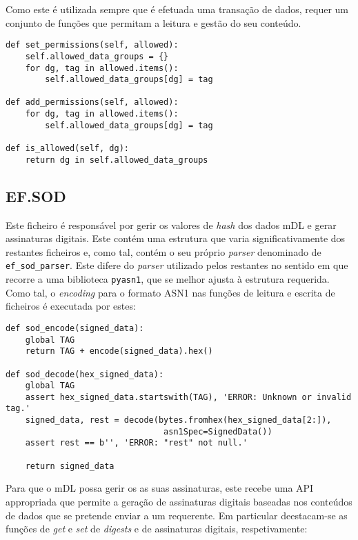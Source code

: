 Como este é utilizada sempre que é efetuada uma transação de dados, requer um conjunto de funções que permitam a leitura e gestão do seu conteúdo.

\begin{Verbatim}[frame=single, framerule=0.5mm]
def set_permissions(self, allowed):
    self.allowed_data_groups = {}
    for dg, tag in allowed.items():
        self.allowed_data_groups[dg] = tag

def add_permissions(self, allowed):
    for dg, tag in allowed.items():
        self.allowed_data_groups[dg] = tag

def is_allowed(self, dg):
    return dg in self.allowed_data_groups
\end{Verbatim}


\subsection{EF.SOD}

Este ficheiro é responsável por gerir os valores de \textit{hash} dos dados mDL e gerar assinaturas digitais. Este contém uma estrutura que varia significativamente dos restantes ficheiros e, como tal, contém o seu próprio \textit{parser} denominado de \texttt{ef\_sod\_parser}. Este difere do \textit{parser} utilizado pelos restantes no sentido em que recorre a uma biblioteca \texttt{pyasn1}, que se melhor ajusta à estrutura requerida. Como tal, o \textit{encoding} para o formato ASN1 nas funções de leitura e escrita de ficheiros é executada por estes:

\begin{Verbatim}[frame=single, framerule=0.5mm]
def sod_encode(signed_data):
    global TAG
    return TAG + encode(signed_data).hex()

def sod_decode(hex_signed_data):
    global TAG
    assert hex_signed_data.startswith(TAG), 'ERROR: Unknown or invalid tag.'
    signed_data, rest = decode(bytes.fromhex(hex_signed_data[2:]),
                                asn1Spec=SignedData())
    assert rest == b'', 'ERROR: "rest" not null.'

    return signed_data
\end{Verbatim}

Para que o mDL possa gerir os as suas assinaturas, este recebe uma API appropriada que permite a geração de assinaturas digitais baseadas nos conteúdos de dados que se pretende enviar a um requerente. Em particular deestacam-se as funções de \textit{get} e \textit{set} de \textit{digests} e de assinaturas digitais, respetivamente:

